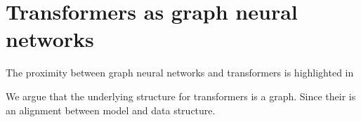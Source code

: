 








\section{Transformers as graph neural networks}

The proximity between graph neural networks and transformers is highlighted in \parencite{hamilton_2020, joshi_2020}

We argue that the underlying structure for transformers is a graph. Since their is an alignment between model and data structure.

